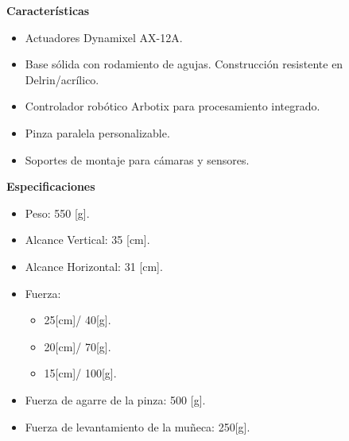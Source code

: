             \textbf{Características}
            \begin{itemize}
                \item Actuadores Dynamixel AX-12A.
                \item Base sólida con rodamiento de agujas. Construcción resistente en Delrin/acrílico.
                \item Controlador robótico Arbotix para procesamiento integrado.
                \item Pinza paralela personalizable.
                \item Soportes de montaje para cámaras y sensores.
            \end{itemize}
            
            \phantom{saltodelineaforzado >:D\\}
            
            \textbf{Especificaciones}
            \begin{itemize}
                \item Peso: 550 [g].
                \item Alcance Vertical: 35 [cm].
                \item Alcance Horizontal: 31 [cm].
                \item Fuerza:
                \begin{itemize}
                    \item 25[cm]/ 40[g].
                    \item 20[cm]/ 70[g].
                    \item 15[cm]/ 100[g].
                \end{itemize}
                \item Fuerza de agarre de la pinza: 500 [g].
                \item Fuerza de levantamiento de la muñeca: 250[g].
            \end{itemize}

